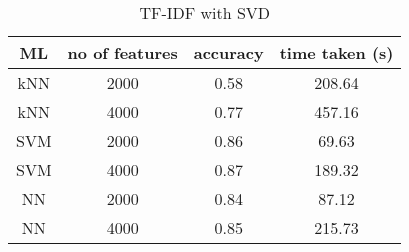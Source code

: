 \begin{table} [ht]
	\centering
	\begin{tabular}{|| c | c | c | c||}
		\hline
		ML & no of features & accuracy & time taken (s) \\ [0.5ex]
		\hline\hline
		kNN & 2000 & 0.58 & 208.64 \\ 
		\hline
		kNN & 4000 & 0.77 & 457.16 \\
		\hline\hline
		SVM & 2000 & 0.86 & 69.63 \\
		\hline
		SVM & 4000 & 0.87 & 189.32 \\
		\hline\hline
		NN & 2000 & 0.84 & 87.12 \\
		\hline
		NN & 4000 & 0.85 & 215.73 \\
		\hline\hline
	\end{tabular}
\caption{TF-IDF with SVD}
\label{tbl:tfidfSvd}
\end{table}